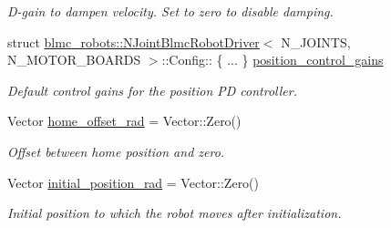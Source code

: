 \begin{DoxyCompactItemize}
\begin{DoxyCompactList}\small\item\em D-\/gain to dampen velocity. Set to zero to disable damping. \end{DoxyCompactList}\item 
struct \hyperlink{classblmc__robots_1_1NJointBlmcRobotDriver}{blmc\+\_\+robots\+::\+N\+Joint\+Blmc\+Robot\+Driver}$<$ N\+\_\+\+J\+O\+I\+N\+TS, N\+\_\+\+M\+O\+T\+O\+R\+\_\+\+B\+O\+A\+R\+DS $>$\+::Config\+:: \{ ... \}  \hyperlink{structblmc__robots_1_1NJointBlmcRobotDriver_1_1Config_a7bd95f2f62c0f88d2cc6cf1ab34a50c8}{position\+\_\+control\+\_\+gains}\hypertarget{structblmc__robots_1_1NJointBlmcRobotDriver_1_1Config_a7bd95f2f62c0f88d2cc6cf1ab34a50c8}{}\label{structblmc__robots_1_1NJointBlmcRobotDriver_1_1Config_a7bd95f2f62c0f88d2cc6cf1ab34a50c8}

\begin{DoxyCompactList}\small\item\em Default control gains for the position PD controller. \end{DoxyCompactList}\item 
Vector \hyperlink{structblmc__robots_1_1NJointBlmcRobotDriver_1_1Config_a67b22638d86285d94021e9d1c0c1b6d7}{home\+\_\+offset\+\_\+rad} = Vector\+::\+Zero()\hypertarget{structblmc__robots_1_1NJointBlmcRobotDriver_1_1Config_a67b22638d86285d94021e9d1c0c1b6d7}{}\label{structblmc__robots_1_1NJointBlmcRobotDriver_1_1Config_a67b22638d86285d94021e9d1c0c1b6d7}

\begin{DoxyCompactList}\small\item\em Offset between home position and zero. \end{DoxyCompactList}\item 
Vector \hyperlink{structblmc__robots_1_1NJointBlmcRobotDriver_1_1Config_a797ec8a753d4daf0f2df89ebaa313a13}{initial\+\_\+position\+\_\+rad} = Vector\+::\+Zero()\hypertarget{structblmc__robots_1_1NJointBlmcRobotDriver_1_1Config_a797ec8a753d4daf0f2df89ebaa313a13}{}\label{structblmc__robots_1_1NJointBlmcRobotDriver_1_1Config_a797ec8a753d4daf0f2df89ebaa313a13}

\begin{DoxyCompactList}\small\item\em Initial position to which the robot moves after initialization. \end{DoxyCompactList}\end{DoxyCompactItemize}
